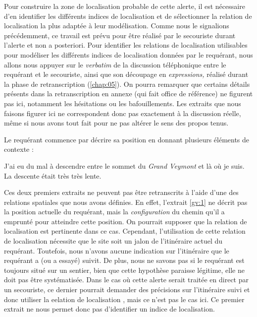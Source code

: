 Pour construire la zone de localisation probable de cette alerte, il
est nécessaire d'en identifier les différents indices de localisation
et de sélectionner la relation de localisation la plus adaptée à leur
modélisation. Comme nous le signalions précédemment, ce travail est
prévu pour être réalisé par le secouriste durant l'alerte et non a
posteriori. Pour identifier les relations de localisation utilisables
pour modéliser les différents indices de localisation données par le
requérant, nous allons nous appuyer sur le \emph{verbatim} de la
discussion téléphonique entre le requérant et le secouriste, ainsi que
son découpage en \emph{expressions,} réalisé durant la phase de
retranscription (\autoref{chap:05}). On pourra remarquer que certains
détails présents dans la retranscription en annexe (qui fait office de
référence) ne figurent pas ici, notamment les hésitations ou les
bafouillements. Les extraits que nous faisons figurer ici ne
correspondent donc pas exactement à la discussion réelle, même si nous
avons tout fait pour ne pas altérer le sens des propos tenus.

Le requérant commence par décrire sa position en donnant plusieurs
éléments de contexte :
%
\begin{dialogue*}
  \Req {} J'ai eu du mal à descendre entre le sommet du
  \emph{Grand Veymont} et là où je suis.  La descente
  était très très lente.
\end{dialogue*}

Ces deux premiers extraits ne peuvent pas être retranscrits à l'aide
d'une des relations spatiales que nous avons définies. En effet,
l'extrait \ref{gv:1} ne décrit pas la position actuelle du requérant,
mais la \emph{configuration} du chemin qu'il a emprunté pour atteindre
cette position. On pourrait supposer que la relation de localisation
 est pertinente dans ce
cas. Cependant, l'utilisation de cette relation de localisation
nécessite que le site soit un jalon de l’itinéraire actuel du
requérant. Toutefois, nous n'avons aucune indication sur l’itinéraire
que le requérant a (ou a essayé) suivit. De plus, nous ne savons pas
si le requérant est toujours situé sur un sentier, bien que cette
hypothèse paraisse légitime, elle ne doit pas être systématisée. Dans
le cas où cette alerte serait traitée en direct par un secouriste, ce
dernier pourrait demander des précisions sur l'itinéraire suivi et
donc utiliser la eelation de localisation
, mais ce n'est pas le
cas ici. Ce premier extrait ne nous permet donc pas d'identifier un
indice de localisation.

